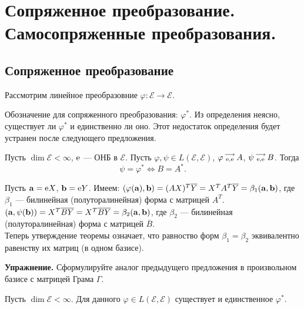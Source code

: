 \section{Сопряженное преобразование. Самосопряженные преобразования.}

\subsection{Сопряженное преобразование}

Рассмотрим линейное преобразовние $\varphi : \mathcal{E}\to \mathcal{E}$.


Обозначение для сопряженного преобразования: $\varphi^{*}$. Из определения неясно, существует ли $\varphi^{*}$ и единственно ли оно. 
Этот недостаток определения будет устранен после следующего предложения.

\begin{predl}\label{p10_3_1}
Пусть $\dim \mathcal{E}<\infty $, $\mathrm{e}$ --- ОНБ в $\mathcal{E}$. Пусть $\varphi, \psi \in L(\mathcal{E}, \mathcal{E})$, 
 $\varphi \begin{smallmatrix} \longrightarrow \\ \mathrm{e}, \mathrm{e} \end{smallmatrix} A$, 
$\psi \begin{smallmatrix} \longrightarrow \\ \mathrm{e}, \mathrm{e} \end{smallmatrix} B$. Тогда
$$\psi = \varphi ^{*} \Leftrightarrow \boxed{B=A^{*}}.$$
\end{predl}
\dok
Пусть $\mathbf{a}=\mathrm{e}X$, $\mathbf{b}=\mathrm{e}Y$. Имеем:
$(\varphi(\mathbf{a}), \mathbf{b}) = (AX)^T\overline{Y} = X^T A^T\overline{Y} = \beta_1 (\mathbf{a}, \mathbf{b})$, где $\beta_1$  --- билинейная (полуторалинейная) форма с матрицей $A^T$.  \\
$(\mathbf{a}, \psi(\mathbf{b})) = X^T\overline{BY} = X^T \overline{B} \overline{Y} = \beta_2 (\mathbf{a}, \mathbf{b})$, 
где $\beta_2$  --- билинейная (полуторалинейная) форма с матрицей $\overline{B}$. \\
Теперь утверждение теоремы означает, что равноство форм $\beta_1=\beta_2$ эквивалентно равенству их матриц (в одном базисе).
\edok

{\bf Упражнение.} Сформулируйте аналог предыдущего предложения в произвольном базисе с матрицей Грама $\Gamma$.

\begin{sled1}
Пусть $\dim \mathcal{E}<\infty $. Для данного $\varphi \in L(\mathcal{E}, \mathcal{E})$
существует и единственное $\varphi ^{*}$.
\end{sled1}

